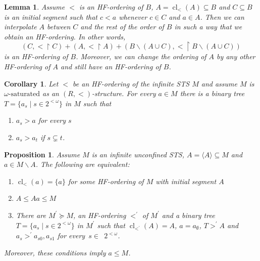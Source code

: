 \documentclass[10pt,a4paper]{article}
\DeclareMathOperator{\cl}{cl}
\theoremstyle{note}
\newtheorem{lemma}[thm]{Lemma}
\newtheorem{prop}[thm]{Proposition}
\newtheorem{cor}[thm]{Corollary}
\begin{document}
\begin{lemma}\label{June_25_2024_1.1} Assume $<$ is an HF-ordering of $B$,  $A=\cl_<(A)\subseteq B$  and  $C\subseteq B$ is an initial segment  such that  $c<a$  whenever $c\in C$ and $a\in A$. Then we can interpolate $A$ between $C$ and the rest of the order of $B$ in such a way that we obtain an HF-ordering. In other words,   $$(C, <\restriction C) +(A, <\restriction A) + (B\smallsetminus (A\cup C), <\restriction B\smallsetminus(A\cup C))$$ is an HF-ordering of $B$. Moreover, we can change the ordering
 of $A$ by any other HF-ordering of $A$ and still have an HF-ordering of $B$.
\end{lemma}

\begin{cor}\label{tree4}
	Let $<$ be an HF-ordering of the infinite STS $M$ and assume %
	$M$ is $\text{$\omega$-saturated}$ as an $(R, <)$-structure.  For every $a\in M$    there is a binary tree $T=\{a_s\mid s\in 2^{<\omega}\}$  in $M$ such that
	\begin{enumerate}
		\item $a_s>a$  for every $s$
		\item $a_s>a_t$  if  $s\subsetneq t$.
	\end{enumerate}
\end{cor}

\begin{prop} \label{May_26_2024_1} Assume  $M$ is an infinite unconfined STS, $A=\langle A\rangle \subseteq  M$  and  $a\in M\smallsetminus A$. The following are equivalent:
	\begin{enumerate}
		\item  $\cl_<(a)=\{a\}$ for some HF-ordering of $M$ with initial segment  $A$
		\item   $A\leq Aa\leq M$
		\item There are $M^\prime\succeq M$, an HF-ordering $<^\prime$ of $M^\prime$ and a binary tree $T=\{a_s\mid s\in 2^{<\omega}\}$ in $M^\prime$ such that $\cl_{<^\prime}(A)=A$,  $a=a_\emptyset$, $T>^\prime A$ and  $a_s>^\prime a_{s0},a_{s1}$ for every~$s\in$~$ 2^{<\omega}$.
	\end{enumerate}
	Moreover, these conditions imply $a\leq M$.
\end{prop}
\end{document}
